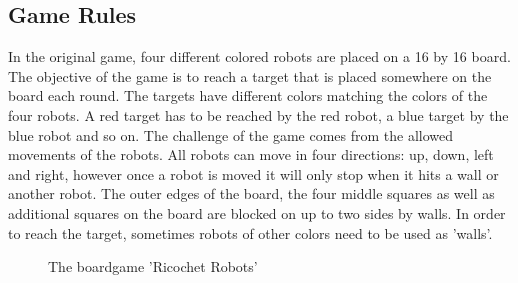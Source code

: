 \documentclass[a4paper,10pt]{article}
\begin{document}
  \subsection{Game Rules}
  \label{subsec:gameRules}
  In the original game, four different colored robots are placed on a 16 by 16 board. The objective of the game is to reach a target that is placed somewhere on the board each round. The targets have different colors matching the colors of the four robots. A red target has to be reached by the red robot, a blue target by the blue robot and so on. The challenge of the game comes from the allowed movements of the robots. All robots can move in four directions: up, down, left and right, however once a robot is moved it will only stop when it hits a wall or another robot. The outer edges of the board, the four middle squares as well as additional squares on the board are blocked on up to two sides by walls. In order to reach the target, sometimes robots of other colors need to be used as 'walls'.
  \begin{figure}[!htb]
  \caption{The boardgame 'Ricochet Robots'}
  \label{fig:originalgame}
  \end{figure}
\end{document}
